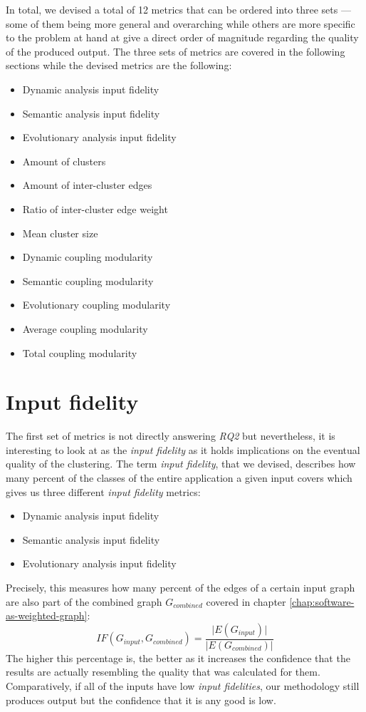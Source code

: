 \documentclass[12pt,a4paper]{report}
\begin{document}
In total, we devised a total of 12 metrics that can be ordered into three sets ---
some of them being more general and overarching while others are more specific
to the problem at hand at give a direct order of magnitude regarding the
quality of the produced output. The three sets of metrics are covered
in the following sections while the devised metrics are the following:
\begin{itemize}
  \item Dynamic analysis input fidelity
  \item Semantic analysis input fidelity
  \item Evolutionary analysis input fidelity
  \item Amount of clusters
  \item Amount of inter-cluster edges
  \item Ratio of inter-cluster edge weight
  \item Mean cluster size
  \item Dynamic coupling modularity
  \item Semantic coupling modularity
  \item Evolutionary coupling modularity
  \item Average coupling modularity
  \item Total coupling modularity
\end{itemize}



\section{Input fidelity} \label{sect:input-fidelity-metrics}

The first set of metrics is not directly answering \textit{RQ2} but nevertheless,
it is interesting to look at as the \textit{input fidelity} as it holds
implications on the eventual quality of the clustering.
The term \textit{input fidelity}, that we devised, describes how many percent
of the classes of the entire application a given input covers which gives us
three different \textit{input fidelity} metrics:
\begin{itemize}[noitemsep]
  \item Dynamic analysis input fidelity
  \item Semantic analysis input fidelity
  \item Evolutionary analysis input fidelity
\end{itemize}

Precisely, this measures how many percent of the edges of a certain input graph
are also part of the combined graph \(G_{combined}\) covered in chapter
\ref{chap:software-as-weighted-graph}:
\[
  IF(G_{input}, G_{combined}) = \frac{\vert E(G_{input}) \vert}{\vert E(G_{combined}) \vert}
\]
The higher this percentage is, the better as it increases the confidence
that the results are actually resembling the quality that was calculated for them.
Comparatively, if all of the inputs have low \textit{input fidelities},
our methodology still produces output but the confidence that it is any good is low.
\end{document}
